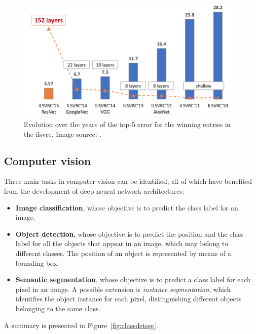 \documentclass[%
    corpo=12pt,
    twoside,
    stile=classica,   
    tipotesi=magistrale,
    evenboxes,
    english,
	numerazioneromana,
]{toptesi}
\begin{document}
\begin{figure}[ht]
	\centering
	\includegraphics[width=.8\textwidth]{imgs/ILSVRC.png}
	\caption[Evolution of top-5 error for the winning entries in \gls{ilsvrc}]{Evolution over the years of the top-5 error for the winning entries in the \gls{ilsvrc}\cite{russakovsky2015imagenet}. Image source: \cite{hanqing2020research}.
	\label{fig:imagenet}}
\end{figure}

\subsection{Computer vision}
Three main tasks in computer vision can be identified, all of which have benefited from the development of deep neural network architectures:

\begin{itemize}
	\item \textbf{Image classification}, whose objective is to predict the class label for an image.
	\item \textbf{Object detection}, whose objective is to predict the position and the class label for all the objects that appear in an image, which may belong to different classes. The position of an object is represented by means of a bounding box.
	\item \textbf{Semantic segmentation}, whose objective is to predict a class label for each pixel in an image. A possible extension is \textit{instance segmentation}, which identifies the object instance for each pixel, distinguishing different objects belonging to the same class.
\end{itemize}

A summary is presented in Figure~\ref{fig:classdetseg}.
\end{document}
